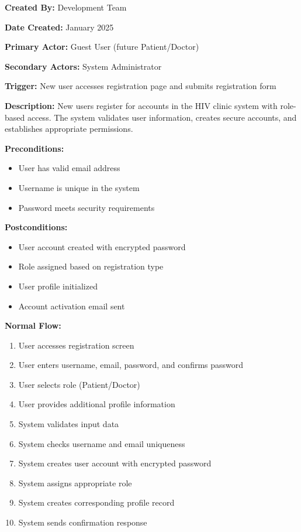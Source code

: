 \documentclass[12pt,a4paper]{article}
\begin{document}
\textbf{Created By:} Development Team

\textbf{Date Created:} January 2025

\textbf{Primary Actor:} Guest User (future Patient/Doctor)

\textbf{Secondary Actors:} System Administrator

\textbf{Trigger:} New user accesses registration page and submits registration form

\textbf{Description:} New users register for accounts in the HIV clinic system with role-based access. The system validates user information, creates secure accounts, and establishes appropriate permissions.

\textbf{Preconditions:}
\begin{itemize}
    \item User has valid email address
    \item Username is unique in the system
    \item Password meets security requirements
\end{itemize}

\textbf{Postconditions:}
\begin{itemize}
    \item User account created with encrypted password
    \item Role assigned based on registration type
    \item User profile initialized
    \item Account activation email sent
\end{itemize}

\textbf{Normal Flow:}
\begin{enumerate}
    \item User accesses registration screen
    \item User enters username, email, password, and confirms password
    \item User selects role (Patient/Doctor)
    \item User provides additional profile information
    \item System validates input data
    \item System checks username and email uniqueness
    \item System creates user account with encrypted password
    \item System assigns appropriate role
    \item System creates corresponding profile record
    \item System sends confirmation response
\end{enumerate}
\end{document}
